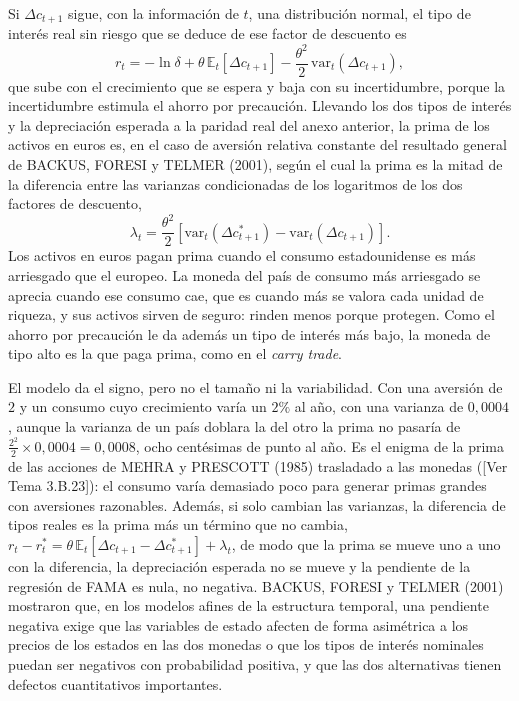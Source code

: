 \documentclass[10pt,a4paper]{article}
\newcommand{\authorfont}[1]{{\fontfamily{EBGaramond-TLF}\selectfont #1}}
\newcounter{anexo}
\begin{document}
Si $\Delta c_{t+1}$ sigue, con la información de $t$, una distribución normal, el tipo de interés real sin riesgo que se deduce de ese factor de descuento es
$$r_t=-\ln\delta+\theta\,\mathbb{E}_t[\Delta c_{t+1}]-\frac{\theta^2}{2}\,\mathrm{var}_t(\Delta c_{t+1}),$$
que sube con el crecimiento que se espera y baja con su incertidumbre, porque la incertidumbre estimula el ahorro por precaución. Llevando los dos tipos de interés y la depreciación esperada a la paridad real del anexo anterior, la prima de los activos en euros es, en el caso de aversión relativa constante del resultado general de BACKUS, FORESI y TELMER (2001), según el cual la prima es la mitad de la diferencia entre las varianzas condicionadas de los logaritmos de los dos factores de descuento,
$$\lambda_t=\frac{\theta^2}{2}\left[\mathrm{var}_t(\Delta c_{t+1}^*)-\mathrm{var}_t(\Delta c_{t+1})\right].$$
Los activos en euros pagan prima cuando el consumo estadounidense es más arriesgado que el europeo. La moneda del país de consumo más arriesgado se aprecia cuando ese consumo cae, que es cuando más se valora cada unidad de riqueza, y sus activos sirven de seguro: rinden menos porque protegen. Como el ahorro por precaución le da además un tipo de interés más bajo, la moneda de tipo alto es la que paga prima, como en el \textit{carry trade}.

El modelo da el signo, pero no el tamaño ni la variabilidad. Con una aversión de $2$ y un consumo cuyo crecimiento varía un $2\%$ al año, con una varianza de $0{,}0004$, aunque la varianza de un país doblara la del otro la prima no pasaría de $\tfrac{2^2}{2}\times0{,}0004=0{,}0008$, ocho centésimas de punto al año. Es el enigma de la prima de las acciones de MEHRA y PRESCOTT (1985) trasladado a las monedas ([\authorfont{Ver Tema 3.B.23}]): el consumo varía demasiado poco para generar primas grandes con aversiones razonables. Además, si solo cambian las varianzas, la diferencia de tipos reales es la prima más un término que no cambia, $r_t-r_t^*=\theta\,\mathbb{E}_t[\Delta c_{t+1}-\Delta c_{t+1}^*]+\lambda_t$, de modo que la prima se mueve uno a uno con la diferencia, la depreciación esperada no se mueve y la pendiente de la regresión de FAMA es nula, no negativa. BACKUS, FORESI y TELMER (2001) mostraron que, en los modelos afines de la estructura temporal, una pendiente negativa exige que las variables de estado afecten de forma asimétrica a los precios de los estados en las dos monedas o que los tipos de interés nominales puedan ser negativos con probabilidad positiva, y que las dos alternativas tienen defectos cuantitativos importantes.
\end{document}
